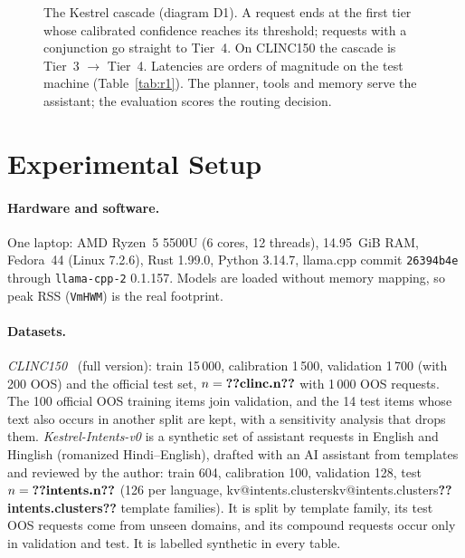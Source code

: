 \documentclass[11pt,a4paper]{article}
\makeatletter
\DeclareRobustCommand{\kv}[1]{\ifcsname kv@#1\endcsname\csname kv@#1\endcsname\else\textbf{??#1??}\fi}
\makeatother
\begin{document}
\begin{figure}[t]
\caption{The Kestrel cascade (diagram D1). A request ends at the first tier whose calibrated confidence reaches its
threshold; requests with a conjunction go straight to Tier~4. On CLINC150 the cascade is Tier~3 $\to$ Tier~4. Latencies
are orders of magnitude on the test machine (Table~\ref{tab:r1}). The planner, tools and memory serve the assistant;
the evaluation scores the routing decision.}
\label{fig:arch}
\end{figure}

\section{Experimental Setup}\label{sec:setup}

\paragraph{Hardware and software.} One laptop: AMD Ryzen~5 5500U (6 cores, 12 threads), 14.95~GiB RAM, Fedora~44
(Linux 7.2.6), Rust 1.99.0, Python 3.14.7, llama.cpp commit \texttt{26394b4e} through \texttt{llama-cpp-2} 0.1.157.
Models are loaded without memory mapping, so peak RSS (\texttt{VmHWM}) is the real footprint.

\paragraph{Datasets.} \emph{CLINC150}~\citep{larson2019clinc} (full version): train 15\,000, calibration 1\,500,
validation 1\,700 (with 200 OOS) and the official test set, $n=\kv{clinc.n}$ with 1\,000 OOS requests. The 100 official
OOS training items join validation, and the 14 test items whose text also occurs in another split are kept, with a
sensitivity analysis that drops them. \emph{Kestrel-Intents-v0} is a synthetic set of assistant requests in English and
Hinglish (romanized Hindi--English), drafted with an AI assistant from templates and reviewed by the author: train 604,
calibration 100, validation 128, test $n=\kv{intents.n}$ (126 per language, \kv{intents.clusters} template families).
It is split by template family, its test OOS requests come from unseen domains, and its compound requests occur only
in validation and test. It is labelled synthetic in every table.
\end{document}
